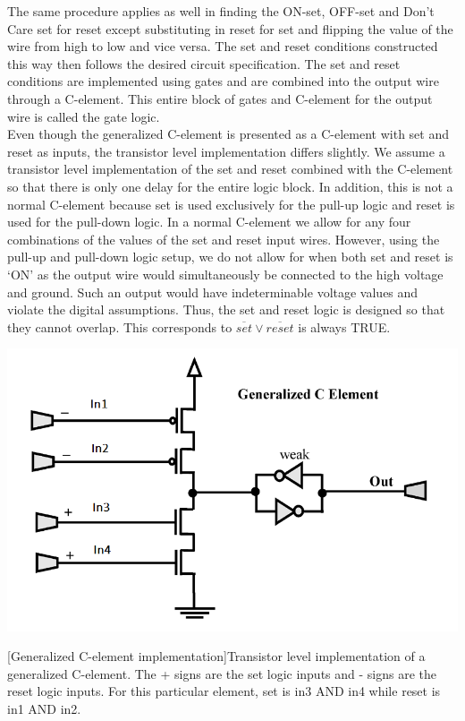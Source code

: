 \documentclass[12pt]{report}
\begin{document}
The same procedure applies as well in finding the ON-set, OFF-set and Don't Care set for reset except substituting in reset for set and flipping the value of the wire from high to low and vice versa. The set and reset conditions constructed this way then follows the desired circuit specification. The set and reset conditions are implemented using gates and are combined into the output wire through a C-element. This entire block of gates and C-element for the output wire is called the gate logic. \\ %

Even though the generalized C-element is presented as a C-element with set and reset as inputs, the transistor level implementation differs slightly. We assume a transistor level implementation of the set and reset combined with the C-element so that there is only one delay for the entire logic block. In addition, this is not a normal C-element because set is used exclusively for the pull-up logic and reset is used for the pull-down logic. In a normal C-element we allow for any four combinations of the values of the set and reset input wires. However, using the pull-up and pull-down logic setup, we do not allow for when both set and reset is `ON' as the output wire would simultaneously be connected to the high voltage and ground. Such an output would have indeterminable voltage values and violate the digital assumptions. Thus, the set and reset logic is designed so that they cannot overlap. This corresponds to $\overline{set}\vee\overline{reset} $ is always TRUE.\\
\begin{center}
\includegraphics[width=.7\textwidth]{genC}
\end{center}
[Generalized C-element implementation]{Transistor level implementation of a generalized C-element. The + signs are the set logic inputs and - signs are the reset logic inputs. For this particular element, set is in3 AND in4 while reset is in1 AND in2.}
\end{document}

